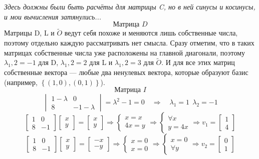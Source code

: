 \documentclass[a3paper,14pt]{extarticle}
\begin{document}
\textit{Здесь должны были быть расчёты для матрицы C, но в ней синусы и косинусы, и мои вычисления затянулись...}
$$\text{Матрица } D$$
Матрицы D, L и $\tilde{O}$ ведут себя похоже и меняются лишь собственные числа, поэтому отдельно каждую рассматривать нет смысла. Сразу отметим, что в таких матрицах собственные числа уже расположены на главной диагонали, поэтому $\lambda_1,2 = -1$ для D, $\lambda_1,2 = 2$ для L и $\lambda_1,2 = 3$ для $\tilde{O}$. И для все этих матриц собственные вектора --- любые два ненулевых вектора, которые образуют базис (например, $\left\{(1, 0), (0, 1)\right\}$).
$$\text{Матрица } I$$
$$\begin{vmatrix}
    1-\lambda & 0 \\ 8 & -1-\lambda
\end{vmatrix} = \lambda^2 - 1 = 0 \quad\Rightarrow\quad \lambda_1=1\ \ \lambda_2=-1$$
$$\begin{bmatrix}
    1 & 0 \\ 8 & -1
\end{bmatrix}\begin{bmatrix}
    x \\ y
\end{bmatrix} = \begin{bmatrix}
    x \\ y
\end{bmatrix} \Rightarrow \begin{cases}
    x=x \\
    4x=y
\end{cases} \Rightarrow \begin{cases}
    \forall x \\
    y = 4x
\end{cases} \Rightarrow v_1 = \begin{bmatrix}
    1 \\ 4
\end{bmatrix}$$
$$\begin{bmatrix}
    1 & 0 \\ 8 & -1
\end{bmatrix}\begin{bmatrix}
    x \\ y
\end{bmatrix} = \begin{bmatrix}
    -x \\ -y
\end{bmatrix} \Rightarrow \begin{cases}
    x=0 \\
    x=0
\end{cases} \Rightarrow \begin{cases}
    x = 0 \\
    \forall y
\end{cases} \Rightarrow v_2 = \begin{bmatrix}
    0 \\ 1
\end{bmatrix}$$\,\\[0.5em]
\end{document}
